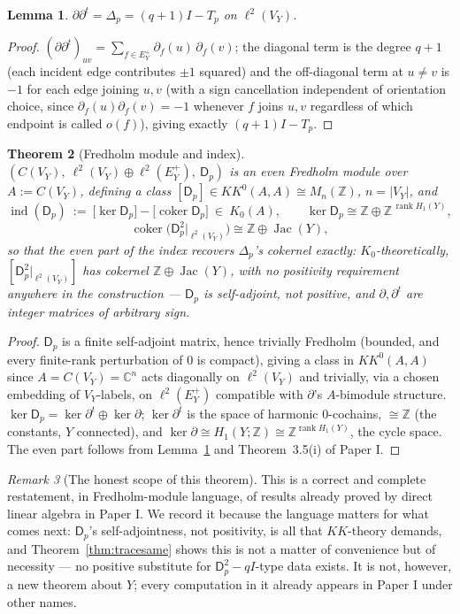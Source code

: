 \documentclass[11pt]{amsart}
\numberwithin{equation}{section}
\newtheorem{theorem}{Theorem}[section]
\newtheorem{lemma}[theorem]{Lemma}
\theoremstyle{definition}
\theoremstyle{remark}
\newtheorem{remark}[theorem]{Remark}
\newcommand{\Z}{\mathbb{Z}}
\newcommand{\C}{\mathbb{C}}
\newcommand{\coker}{\operatorname{coker}}
\newcommand{\Jac}{\operatorname{Jac}}
\newcommand{\ind}{\operatorname{ind}}
\newcommand{\rank}{\operatorname{rank}}
\begin{document}
\begin{lemma}\label{lem:laplacian}
$\partial\partial^t=\Delta_p=(q+1)I-T_p$ on $\ell^2(V_Y)$.
\end{lemma}

\begin{proof}
$(\partial\partial^t)_{uv}=\sum_{f\in E_Y^+}\partial_{f}(u)\,\partial_f(v)$; the diagonal
term is the degree $q+1$ (each incident edge contributes $\pm1$ squared) and the
off-diagonal term at $u\ne v$ is $-1$ for each edge joining $u,v$ (with a sign
cancellation independent of orientation choice, since $\partial_f(u)\partial_f(v)=-1$
whenever $f$ joins $u,v$ regardless of which endpoint is called $o(f)$), giving exactly
$(q+1)I-T_p$.
\end{proof}

\begin{theorem}[Fredholm module and index]\label{thm:index}
$(C(V_Y),\ \ell^2(V_Y)\oplus\ell^2(E_Y^+),\ \mathsf D_p)$ is an even Fredholm module over
$A:=C(V_Y)$, defining a class $[\mathsf D_p]\in KK^0(A,A)\cong M_n(\Z)$, $n=|V_Y|$, and
\[
\ind(\mathsf D_p)\ :=\ \bigl[\ker\mathsf D_p\bigr]-\bigl[\coker\mathsf D_p\bigr]
\ \in\ K_0(A),
\qquad
\ker\mathsf D_p\cong\Z\oplus\Z^{\,\rank H_1(Y)},
\]
\[
\coker\bigl(\mathsf D_p^2|_{\ell^2(V_Y)}\bigr)\cong\Z\oplus\Jac(Y),
\]
so that the even part of the index recovers $\Delta_p$'s cokernel exactly:
$K_0$-theoretically, $[\mathsf D_p^2|_{\ell^2(V_Y)}]$ has cokernel $\Z\oplus\Jac(Y)$, with
\emph{no positivity requirement anywhere in the construction} --- $\mathsf D_p$ is
self-adjoint, not positive, and $\partial,\partial^t$ are integer matrices of arbitrary
sign.
\end{theorem}

\begin{proof}
$\mathsf D_p$ is a finite self-adjoint matrix, hence trivially Fredholm (bounded, and
every finite-rank perturbation of $0$ is compact), giving a class in $KK^0(A,A)$ since
$A=C(V_Y)=\C^n$ acts diagonally on $\ell^2(V_Y)$ and trivially, via a chosen embedding of
$V_Y$-labels, on $\ell^2(E_Y^+)$ compatible with $\partial$'s $A$-bimodule structure.
$\ker\mathsf D_p=\ker\partial^t\oplus\ker\partial$; $\ker\partial^t$ is the space of
harmonic $0$-cochains, $\cong\Z$ (the constants, $Y$ connected), and $\ker\partial\cong
H_1(Y;\Z)\cong\Z^{\rank H_1(Y)}$, the cycle space. The even part follows from
Lemma~\ref{lem:laplacian} and Theorem~3.5(i) of Paper I.
\end{proof}

\begin{remark}[The honest scope of this theorem]\label{rem:scope2}
This is a correct and complete restatement, in Fredholm-module language, of results
already proved by direct linear algebra in Paper I. We record it because the language
matters for what comes next: $\mathsf D_p$'s self-adjointness, not positivity, is all
that $KK$-theory demands, and Theorem~\ref{thm:tracesame} shows this is not a matter of
convenience but of necessity --- no positive substitute for $\mathsf D_p^2-qI$-type data
exists. It is not, however, a new theorem about $Y$; every computation in it already
appears in Paper I under other names.
\end{remark}
\end{document}
